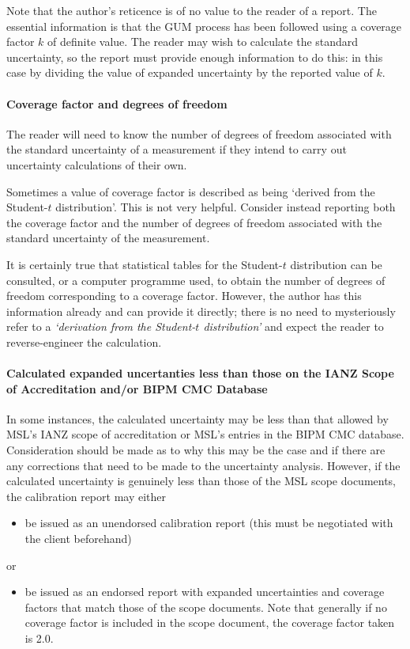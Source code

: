 Note that the author's reticence is of no value to the reader of a report. The essential information is that the GUM process has been followed using a coverage factor $k$ of definite value. The reader may wish to calculate the standard uncertainty, so the report must provide enough information to do this: in this case by dividing the value of expanded uncertainty by the reported value of $k$.

\paragraph{Coverage factor and degrees of freedom}
The reader will need to know the number of degrees of freedom associated with the standard uncertainty of a measurement if they intend to carry out uncertainty calculations of their own. 

Sometimes a value of coverage factor is described as being `derived from the Student-$t$ distribution'. This is not very helpful. Consider instead reporting both the coverage factor and the number of degrees of freedom associated with the standard uncertainty of the measurement.

It is certainly true that statistical tables for the Student-$t$ distribution can be consulted, or a computer programme used, to obtain the number of degrees of freedom corresponding to a coverage factor. However, the author has this information already and can provide it directly; there is no need to mysteriously refer to a \textit{`derivation from the Student-$t$ distribution'} and expect the reader to reverse-engineer the calculation. 

\paragraph{Calculated expanded uncertanties less than those on the IANZ Scope of Accreditation and/or BIPM CMC Database}
In some instances, the calculated uncertainty may be less than that allowed by MSL's IANZ scope of accreditation or MSL's entries in the BIPM CMC database.  Consideration should be made as to why this may be the case and if there are any corrections that need to be made to the uncertainty analysis.  However, if the calculated uncertainty is genuinely less than those of the MSL scope documents, the calibration report may either

\begin{itemize}
	\item be issued as an unendorsed calibration report (this must be negotiated with the client beforehand)
\end{itemize}
or
\begin{itemize}
	\item be issued as an endorsed report with expanded uncertainties and coverage factors that match those of the scope documents.  Note that generally if no coverage factor is included in the scope document, the coverage factor taken is 2.0.
\end{itemize}

